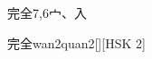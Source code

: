 \begin{entry}{完全}{7,6}{⼧、⼊}
  \begin{phonetics}{完全}{wan2quan2}[][HSK 2]
  \end{phonetics}
\end{entry}
